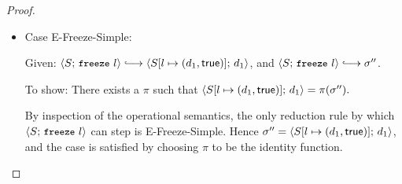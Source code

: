 \begin{proof}
\begin{itemize}
  \item Case {\sc E-Freeze-Simple}:

    Given: $\config{S}{\freeze{l}} \parstepsto
    \config{\extS{S}{l}{d_1}{\frozentrue}}{d_1}$, and
    $\config{S}{\freeze{l}} \parstepsto \conf''$.

    To show: There exists a $\pi$ such that
    $\langle S[l \mapsto (d_1, \textsf{true})];\, d_1 \rangle = \pi(\sigma'').$

    By inspection of the operational semantics, the only reduction
    rule by which $\langle S;\, \mbox{\small{\texttt{freeze}}}~l \rangle$ can step is {\sc
      E-Freeze-Simple}.  Hence $\sigma'' =
    \langle S[l \mapsto (d_1, \textsf{true})];\, d_1 \rangle$, and the case is
    satisfied by choosing $\pi$ to be the identity function.

  \end{itemize}
\end{proof}

